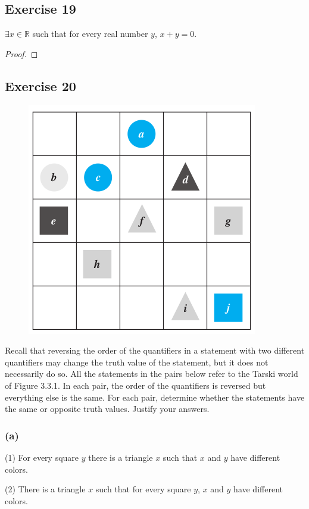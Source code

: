 \documentclass[14pt]{extarticle}
\newcommand{\R}{\mathbb{R}}
\newcommand{\te}{\exists}
\begin{document}
\subsection{Exercise 19}
$\te x \in \R$ such that for every real number $y$, $x + y = 0$.
\begin{proof}

\end{proof}

\subsection{Exercise 20}
\begin{figure}[ht!]
\centering
\includegraphics[scale=0.4]{../images/3.3.1.png}
\end{figure}

Recall that reversing the order of the quantifiers in a statement with two different quantifiers may change the truth value of the statement, but it does not necessarily do so. All the statements in the pairs below refer to the Tarski world of Figure 3.3.1. In each pair, the order of the quantifiers is reversed but everything else is the same. For each pair, determine whether the statements have the same or opposite truth values. Justify your answers.

\subsubsection{(a)}
(1) For every square $y$ there is a triangle $x$ such that $x$ and $y$ have different colors.

(2) There is a triangle $x$ such that for every square $y$, $x$ and $y$ have different colors.
\end{document}
